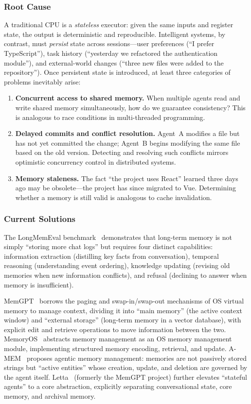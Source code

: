 \documentclass[11pt,a4paper]{article}
\begin{document}
\subsubsection{Root Cause}
A traditional CPU is a \emph{stateless} executor: given the same inputs and register state, the output is deterministic and reproducible.
Intelligent systems, by contrast, must \emph{persist} state across sessions---user preferences (``I prefer TypeScript''), task history (``yesterday we refactored the authentication module''), and external-world changes (``three new files were added to the repository'').
Once persistent state is introduced, at least three categories of problems inevitably arise:

\begin{enumerate}[nosep]
\item \textbf{Concurrent access to shared memory.}
When multiple agents read and write shared memory simultaneously, how do we guarantee consistency?
This is analogous to race conditions in multi-threaded programming.

\item \textbf{Delayed commits and conflict resolution.}
Agent~A modifies a file but has not yet committed the change; Agent~B begins modifying the same file based on the old version.
Detecting and resolving such conflicts mirrors optimistic concurrency control in distributed systems.

\item \textbf{Memory staleness.}
The fact ``the project uses React'' learned three days ago may be obsolete---the project has since migrated to Vue.
Determining whether a memory is still valid is analogous to cache invalidation.
\end{enumerate}

\subsubsection{Current Solutions}
The LongMemEval benchmark~\cite{longmemeval2024} demonstrates that long-term memory is not simply ``storing more chat logs'' but requires four distinct capabilities: information extraction (distilling key facts from conversation), temporal reasoning (understanding event ordering), knowledge updating (revising old memories when new information conflicts), and refusal (declining to answer when memory is insufficient).

MemGPT~\cite{memgpt2023} borrows the paging and swap-in/swap-out mechanisms of OS virtual memory to manage context, dividing it into ``main memory'' (the active context window) and ``external storage'' (long-term memory in a vector database), with explicit edit and retrieve operations to move information between the two.
MemoryOS~\cite{memoryos2025} abstracts memory management as an OS memory management module, implementing structured memory encoding, retrieval, and update.
A-MEM~\cite{amem2025} proposes agentic memory management: memories are not passively stored strings but ``active entities'' whose creation, update, and deletion are governed by the agent itself.
Letta~\cite{letta_stateful_2026} (formerly the MemGPT project) further elevates ``stateful agents'' to a core abstraction, explicitly separating conversational state, core memory, and archival memory.
\end{document}
